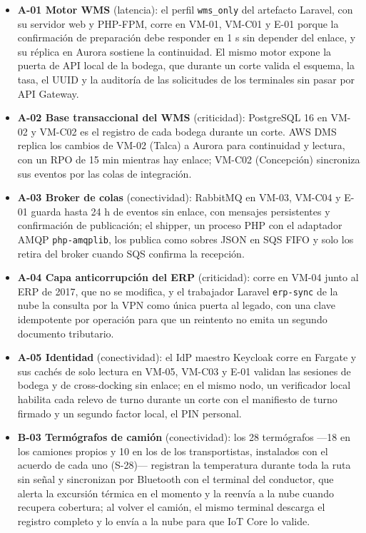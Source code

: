 \begin{itemize}
  \item \textbf{A-01 Motor WMS} (latencia): el perfil \texttt{wms\_only} del artefacto Laravel, con su servidor web y PHP-FPM, corre en VM-01, VM-C01 y E-01 porque la confirmación de preparación debe responder en 1 s sin depender del enlace, y su réplica en Aurora sostiene la continuidad. El mismo motor expone la puerta de API local de la bodega, que durante un corte valida el esquema, la tasa, el UUID y la auditoría de las solicitudes de los terminales sin pasar por API Gateway.
  \item \textbf{A-02 Base transaccional del WMS} (criticidad): PostgreSQL 16 en VM-02 y VM-C02 es el registro de cada bodega durante un corte. AWS DMS replica los cambios de VM-02 (Talca) a Aurora para continuidad y lectura, con un RPO de 15 min mientras hay enlace; VM-C02 (Concepción) sincroniza sus eventos por las colas de integración.
  \item \textbf{A-03 Broker de colas} (conectividad): RabbitMQ en VM-03, VM-C04 y E-01 guarda hasta 24 h de eventos sin enlace, con mensajes persistentes y confirmación de publicación; el shipper, un proceso PHP con el adaptador AMQP \texttt{php-amqplib}, los publica como sobres JSON en SQS FIFO y solo los retira del broker cuando SQS confirma la recepción.
  \item \textbf{A-04 Capa anticorrupción del ERP} (criticidad): corre en VM-04 junto al ERP de 2017, que no se modifica, y el trabajador Laravel \texttt{erp-sync} de la nube la consulta por la VPN como única puerta al legado, con una clave idempotente por operación para que un reintento no emita un segundo documento tributario.
  \item \textbf{A-05 Identidad} (conectividad): el IdP maestro Keycloak corre en Fargate y sus cachés de solo lectura en VM-05, VM-C03 y E-01 validan las sesiones de bodega y de cross-docking sin enlace; en el mismo nodo, un verificador local habilita cada relevo de turno durante un corte con el manifiesto de turno firmado y un segundo factor local, el PIN personal.
  \item \textbf{B-03 Termógrafos de camión} (conectividad): los 28 termógrafos —18 en los camiones propios y 10 en los de los transportistas, instalados con el acuerdo de cada uno (S-28)— registran la temperatura durante toda la ruta sin señal y sincronizan por Bluetooth con el terminal del conductor, que alerta la excursión térmica en el momento y la reenvía a la nube cuando recupera cobertura; al volver el camión, el mismo terminal descarga el registro completo y lo envía a la nube para que IoT Core lo valide.

\end{itemize}
